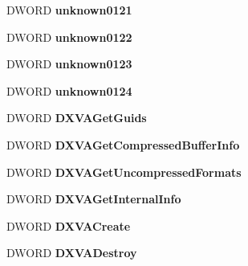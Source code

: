 \begin{DoxyCompactItemize}
D\+W\+O\+RD {\bfseries unknown0121}
\item 
\mbox{\label{struct__tag_d3_d9___c_a_l_l_b_a_c_k_s_a304db3bd652aadf7452f1b4ec22e1532}} 
D\+W\+O\+RD {\bfseries unknown0122}
\item 
\mbox{\label{struct__tag_d3_d9___c_a_l_l_b_a_c_k_s_a4cd487fcd979201e9dd99cac74c65553}} 
D\+W\+O\+RD {\bfseries unknown0123}
\item 
\mbox{\label{struct__tag_d3_d9___c_a_l_l_b_a_c_k_s_ae3676dd0e05d9e9b939324d737d7779b}} 
D\+W\+O\+RD {\bfseries unknown0124}
\item 
\mbox{\label{struct__tag_d3_d9___c_a_l_l_b_a_c_k_s_a4ae5ffcbf9eb1c72a21d21198f592610}} 
D\+W\+O\+RD {\bfseries D\+X\+V\+A\+Get\+Guids}
\item 
\mbox{\label{struct__tag_d3_d9___c_a_l_l_b_a_c_k_s_a911329f9cc055050466d2d8f90c9a231}} 
D\+W\+O\+RD {\bfseries D\+X\+V\+A\+Get\+Compressed\+Buffer\+Info}
\item 
\mbox{\label{struct__tag_d3_d9___c_a_l_l_b_a_c_k_s_ae4ad398a9b7badd37761ade2524ad8b6}} 
D\+W\+O\+RD {\bfseries D\+X\+V\+A\+Get\+Uncompressed\+Formats}
\item 
\mbox{\label{struct__tag_d3_d9___c_a_l_l_b_a_c_k_s_aba8a27f9371df41bc60c621d815e5285}} 
D\+W\+O\+RD {\bfseries D\+X\+V\+A\+Get\+Internal\+Info}
\item 
\mbox{\label{struct__tag_d3_d9___c_a_l_l_b_a_c_k_s_a8c903941002c9328843ea4100afea071}} 
D\+W\+O\+RD {\bfseries D\+X\+V\+A\+Create}
\item 
\mbox{\label{struct__tag_d3_d9___c_a_l_l_b_a_c_k_s_af813701350ca4262405ae2f4b5f01c82}} 
D\+W\+O\+RD {\bfseries D\+X\+V\+A\+Destroy}
\item 
\mbox{\label{struct__tag_d3_d9___c_a_l_l_b_a_c_k_s_afbdd23fa21962fcefafd65855047fc03}} 

\end{DoxyCompactItemize}
